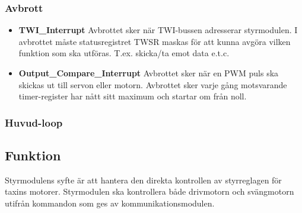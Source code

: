 \documentclass[designspec/spec.tex]{subfiles}
\begin{document}
\subsubsection{Avbrott}

\begin{itemize}
    \item \textbf{TWI\_Interrupt} Avbrottet sker när TWI-bussen adresserar
    styrmodulen. I avbrottet måste statusregistret TWSR maskas för att kunna
    avgöra vilken funktion som ska utföras. T.ex. skicka/ta emot data e.t.c. 

    \item \textbf{Output\_Compare\_Interrupt} Avbrottet sker när en PWM puls
    ska skickas ut till servon eller motorn. Avbrottet sker varje gång
    motsvarande timer-register har nått sitt maximum och startar om från noll. 
\end{itemize}
\subsubsection{Huvud-loop}

\subsection{Funktion}

Styrmodulens syfte är att hantera den direkta kontrollen av styrreglagen för
taxins motorer. Styrmodulen ska kontrollera både drivmotorn och svängmotorn
utifrån kommandon som ges av kommunikationsmodulen.
\end{document}
